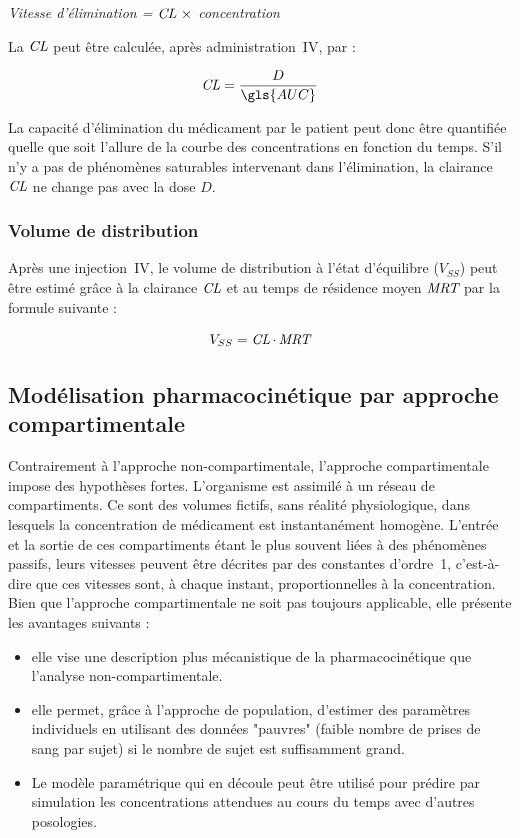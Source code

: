 \begin{center}
\textit{Vitesse d'élimination = $\operatorname{\textit{CL}} \, \times$ concentration}
\end{center}

La $\operatorname{\textit{CL}}$ peut être calculée, après administration~\gls{IV}, par :

\begin{equation}
\CL = \frac{D}{\gls{AUC}}
\label{eq:11}
\end{equation}

La capacité d'élimination du médicament par le patient peut donc être quantifiée quelle que soit l'allure de la courbe des concentrations en fonction du temps. S'il n'y a pas de phénomènes saturables intervenant dans l'élimination, la clairance $\operatorname{\textit{CL}}$ ne change pas avec la dose $D$.

\subsubsection{Volume de distribution}
Après une injection~\gls{IV}, le volume de distribution à l'état d'équilibre ($V_{SS}$) peut être estimé grâce à la clairance $\operatorname{\textit{CL}}$ et au temps de résidence moyen $\operatorname{\textit{MRT}}$ par la formule suivante :

\begin{equation}
V_{SS} = \operatorname{\textit{CL}} \cdot \operatorname{\textit{MRT}}
\label{eq:12}
\end{equation}

\subsection{Modélisation pharmacocinétique par approche compartimentale}
Contrairement à l'approche non-compartimentale, l'approche compartimentale impose des hypothèses fortes. L'organisme est assimilé à un réseau de compartiments. Ce sont des volumes fictifs, sans réalité physiologique, dans lesquels la concentration de médicament est instantanément homogène. L'entrée et la sortie de ces compartiments étant le plus souvent liées à des phénomènes passifs, leurs vitesses peuvent être décrites par des constantes d'ordre~1, c'est-à-dire que ces vitesses sont, à chaque instant, proportionnelles à la concentration. Bien que l'approche compartimentale ne soit pas toujours applicable, elle présente les avantages suivants :
\begin{itemize}
\item elle vise une description plus mécanistique de la pharmacocinétique que l'analyse non-compartimentale.

\item elle permet, grâce à l'approche de population, d'estimer des paramètres individuels en utilisant des données "pauvres" (faible nombre de prises de sang par sujet) si le nombre de sujet est suffisamment grand.

\item Le modèle paramétrique qui en découle peut être utilisé pour prédire par simulation les concentrations attendues au cours du temps avec d'autres posologies.
\end{itemize}

